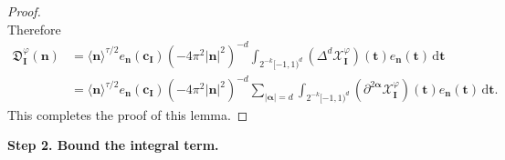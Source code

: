 \documentclass[12pt]{amsart}
\theoremstyle{definition}
\theoremstyle{remark}
\newcommand{\bt}{\boldsymbol{t}}
\numberwithin{equation}{section}
\begin{document}
\begin{proof}
\[\]
Therefore
\begin{align*}
\mathfrak{D}_{\boldsymbol{I}}^\varphi(\boldsymbol{n})&=\langle \boldsymbol{n}\rangle^{\tau/2}e_{\boldsymbol{n}}(\boldsymbol{c}_{\boldsymbol{I}})(-4\pi^2|\boldsymbol{n}|^2)^{-d}\int_{2^{-k}[-1,1)^d}(\Delta^d\mathcal{X}_{\boldsymbol{I}}^\varphi)(\bt)e_{\boldsymbol{n}}(\bt)\,\mathrm{d}\bt\\
&=\langle \boldsymbol{n}\rangle^{\tau/2}e_{\boldsymbol{n}}(\boldsymbol{c}_{\boldsymbol{I}})(-4\pi^2|\boldsymbol{n}|^2)^{-d}\sum_{|\boldsymbol{\alpha}|=d}\int_{2^{-k}[-1,1)^d}(\partial^{2\boldsymbol{\alpha}}\mathcal{X}_{\boldsymbol{I}}^\varphi)(\bt)e_{\boldsymbol{n}}(\bt)\,\mathrm{d}\bt.
\end{align*}
This completes the proof of this lemma.
\end{proof}

\medskip
{\flushleft \bf Step 2. Bound the integral term.}
\medskip
\end{document}
